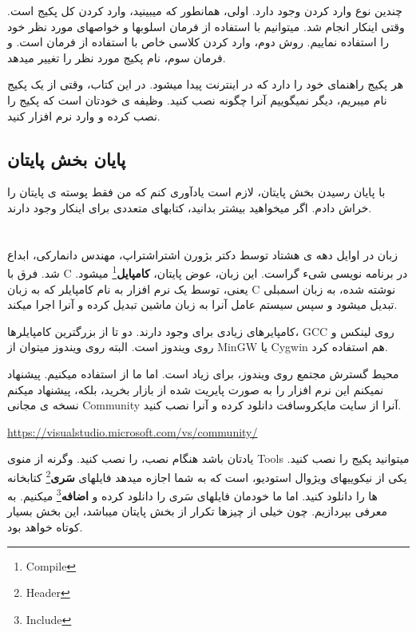 \documentclass[14pt,a4paper]{memoir}
\begin{document}
 چندین نوع وارد کردن وجود دارد. اولی، همانطور که میبینید، وارد کردن کل پکیج است. وقتی اینکار انجام شد. میتوانیم با استفاده از فرمان  اسلوبها و خواصهای مورد نظر خود را استفاده نماییم. روش دوم، وارد کردن کلاسی خاص با استفاده از فرمان  است. و فرمان سوم، نام پکیج مورد نظر را تغییر میدهد. 
	 
	 
	 هر پکیج راهنمای خود را دارد که در اینترنت پیدا میشود. در این کتاب، وقتی از یک پکیج نام میبریم، دیگر نمیگوییم آنرا چگونه نصب کنید. وظیفه ی خودتان است که پکیج را نصب کرده و وارد نرم افزار کنید.
	 
	 \subsection{پایان بخش پایتان}
	 
	 با پایان رسیدن بخش پایتان، لازم است یادآوری کنم که من فقط پوسته ی پایتان را خراش دادم. اگر میخواهید بیشتر بدانید، کتابهای متعددی برای اینکار وجود دارند.
	 
	 
	 
	 \section{}\label{cpp}
	 زبان  در اوایل دهه ی هشتاد توسط دکتر بژورن اشتراشتراپ، مهندس دانمارکی، ابداع شد. فرق  با C در برنامه نویسی شیء گراست. این زبان، عوض پایتان، \textbf{کامپایل}\footnote{Compile} میشود. یعنی، توسط یک نرم افزار به نام کامپایلر که به زبان C نوشته شده، به زبان اسمبلی تبدیل میشود و سپس سیستم عامل آنرا به زبان ماشین تبدیل کرده و آنرا اجرا میکند. 
	 
	 
	 کامپایرهای زیادی برای  وجود دارند. دو تا از بزرگترین کامپایلرها، GCC روی لینکس و  روی ویندوز است. البته روی ویندوز میتوان از MinGW یا Cygwin هم استفاده کرد.
	  
	 محیط گسترش مجتمع روی ویندوز، برای  زیاد است. اما ما از  استفاده میکنیم. پیشنهاد نمیکنم این نرم افزار را به صورت پایریت شده از بازار بخرید، بلکه، پیشنهاد میکنم نسخه ی مجانی Community آنرا از سایت مایکروسافت دانلود کرده و آنرا نصب کنید.
	 
	 \url{https://visualstudio.microsoft.com/vs/community/}
	 
	 
	  یادتان باشد هنگام نصب،  را نصب کنید. وگرنه از منوی Tools میتوانید پکیج را نصب کنید. یکی از نیکوییهای ویژوال استودیو،  است که به شما اجازه میدهد فایلهای \textbf{سَری}\footnote{Header} کتابخانه ها را دانلود کنید. اما ما خودمان فایلهای سَری را دانلود کرده و \textbf{اضافه}\footnote{Include} میکنیم. به معرفی  بپردازیم. چون خیلی از چیزها تکرار از بخش پایتان میباشد، این بخش بسیار کوتاه خواهد بود.
	  
\end{document}
